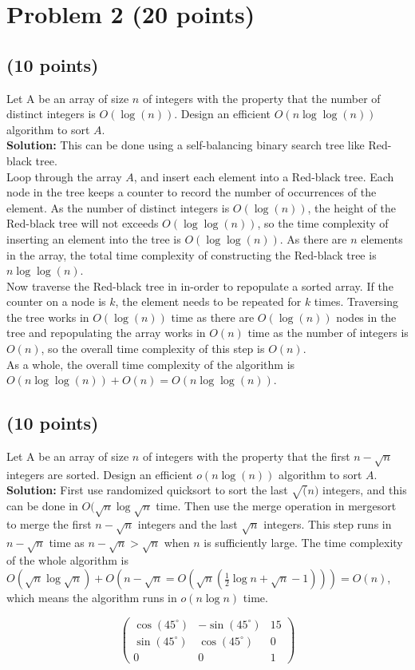 \documentclass[letterpaper, 11pt]{article}
\begin{document}
\section{Problem 2 (20 points)}
\subsection{(10 points)}
Let A be an array of size $n$ of integers with the property that the number of distinct integers is  $O(\log(n))$. Design an efficient $O(n\log\log(n))$ algorithm to sort $A$.\\
\textbf{Solution:} This can be done using a self-balancing binary search tree like Red-black tree. 
\\Loop through the array $A$, and insert each element into a Red-black tree. Each node in the tree keeps a counter to record the number of occurrences of the element. As the number of distinct integers is $O(\log(n))$, the height of the Red-black tree will not exceeds $O(\log\log(n))$, so the time complexity of inserting an element into the tree is $O(\log\log(n))$. As there are $n$
elements in the array, the total time complexity of constructing the Red-black tree is $n\log\log(n)$.\\
Now traverse the Red-black tree in in-order to repopulate a sorted array. If the counter on a node is $k$, the element needs to be repeated for $k$ times. Traversing the tree works in $O(\log(n))$ time as there are $O(\log(n))$ nodes in the tree and repopulating the array works in $O(n)$ time as the number of integers is $O(n)$, so the overall time complexity of this step is $O(n)$.\\
As a whole, the overall time complexity of the algorithm is $O(n\log\log(n)) + O(n)=O(n\log\log(n))$.

\subsection{(10 points)}
Let A be an array of size $n$ of integers with the property that the first $n-\sqrt{n}$ integers are sorted. Design an efficient $o(n\log(n))$ algorithm to sort $A$.\\

\textbf{Solution:} First use randomized quicksort to sort the last $\sqrt(n)$ integers, and this can be done in $O(\sqrt{n}\log{\sqrt{n}}$ time. Then use the merge operation in mergesort to merge the first $n-\sqrt{n}$ integers and the last $\sqrt{n}$ integers. This step runs in $n-\sqrt{n}$ time as $n-\sqrt{n}>\sqrt{n}$ when $n$ is sufficiently large. The time complexity of the whole algorithm is $O(\sqrt{n}\log{\sqrt{n}}) +
O(n-\sqrt{n}=O(\sqrt{n}(\frac{1}{2}\log{n}+\sqrt{n}-1)))=O(n)$, which means the algorithm runs in $o(n\log{n})$ time.

$$
\begin{pmatrix}
    \cos(45^{\circ}) & -\sin(45^{\circ}) & 15 \\
    \sin(45^{\circ}) & \cos(45^{\circ}) & 0\\
    0 & 0 & 1
\end{pmatrix}
$$
\end{document}
